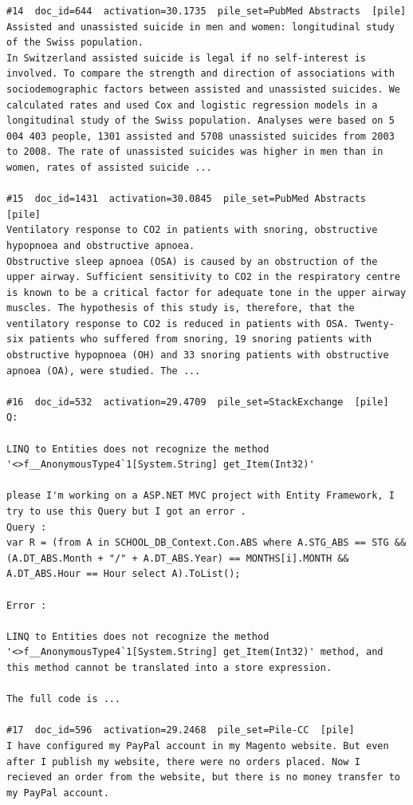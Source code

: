 \begin{verbatim}
#14  doc_id=644  activation=30.1735  pile_set=PubMed Abstracts  [pile]
Assisted and unassisted suicide in men and women: longitudinal study of the Swiss population.
In Switzerland assisted suicide is legal if no self-interest is involved. To compare the strength and direction of associations with sociodemographic factors between assisted and unassisted suicides. We calculated rates and used Cox and logistic regression models in a longitudinal study of the Swiss population. Analyses were based on 5 004 403 people, 1301 assisted and 5708 unassisted suicides from 2003 to 2008. The rate of unassisted suicides was higher in men than in women, rates of assisted suicide ...

#15  doc_id=1431  activation=30.0845  pile_set=PubMed Abstracts  [pile]
Ventilatory response to CO2 in patients with snoring, obstructive hypopnoea and obstructive apnoea.
Obstructive sleep apnoea (OSA) is caused by an obstruction of the upper airway. Sufficient sensitivity to CO2 in the respiratory centre is known to be a critical factor for adequate tone in the upper airway muscles. The hypothesis of this study is, therefore, that the ventilatory response to CO2 is reduced in patients with OSA. Twenty-six patients who suffered from snoring, 19 snoring patients with obstructive hypopnoea (OH) and 33 snoring patients with obstructive apnoea (OA), were studied. The ...

#16  doc_id=532  activation=29.4709  pile_set=StackExchange  [pile]
Q:

LINQ to Entities does not recognize the method '<>f__AnonymousType4`1[System.String] get_Item(Int32)'

please I'm working on a ASP.NET MVC project with Entity Framework, I try to use this Query but I got an error .
Query :
var R = (from A in SCHOOL_DB_Context.Con.ABS where A.STG_ABS == STG && (A.DT_ABS.Month + "/" + A.DT_ABS.Year) == MONTHS[i].MONTH && A.DT_ABS.Hour == Hour select A).ToList();

Error :

LINQ to Entities does not recognize the method
'<>f__AnonymousType4`1[System.String] get_Item(Int32)' method, and
this method cannot be translated into a store expression.

The full code is ...

#17  doc_id=596  activation=29.2468  pile_set=Pile-CC  [pile]
I have configured my PayPal account in my Magento website. But even after I publish my website, there were no orders placed. Now I recieved an order from the website, but there is no money transfer to my PayPal account.


\end{verbatim}
